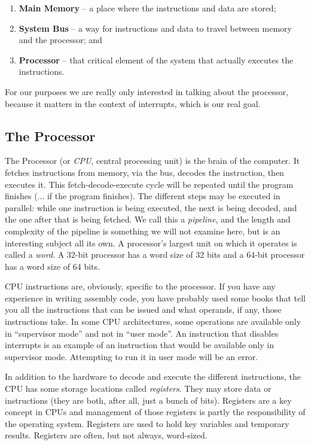 \documentclass[a4paper]{report}
\begin{document}
\begin{enumerate}
	\item \textbf{Main Memory} -- a place where the instructions and data are stored;
	\item \textbf{System Bus} -- a way for instructions and data to travel between memory and the processor; and
	\item \textbf{Processor} -- that critical element of the system that actually executes the instructions.
\end{enumerate}

For our purposes we are really only interested in talking about the processor, because it matters in the context of interrupts, which is our real goal.

\subsection*{The Processor}

The Processor (or \textit{CPU}, central processing unit) is the brain of the computer. It fetches instructions from memory, via the bus, decodes the instruction, then executes it. This fetch-decode-execute cycle will be repeated until the program finishes (... if the program finishes). The different steps may be executed in parallel: while one instruction is being executed, the next is being decoded, and the one after that is being fetched. We call this a \textit{pipeline}, and the length and complexity of the pipeline is something we will not examine here, but is an interesting subject all its own. A processor's largest unit on which it operates is called a \textit{word}. A 32-bit processor has a word size of 32 bits and a 64-bit processor has a word size of 64 bits.

CPU instructions are, obviously, specific to the processor. If you have any experience in writing assembly code, you have probably used some books that tell you all the instructions that can be issued and what operands, if any, those instructions take. In some CPU architectures, some operations are available only in ``supervisor mode'' and not in ``user mode''. An instruction that disables interrupts is an example of an instruction that would be available only in supervisor mode. Attempting to run it in user mode will be an error.

In addition to the hardware to decode and execute the different instructions, the CPU has some storage locations called \textit{registers}. They may store data or instructions (they are both, after all, just a bunch of bits). Registers are a key concept in CPUs and management of those registers is partly the responsibility of the operating system. Registers are used to hold key variables and temporary results. Registers are often, but not always, word-sized.
\end{document}
